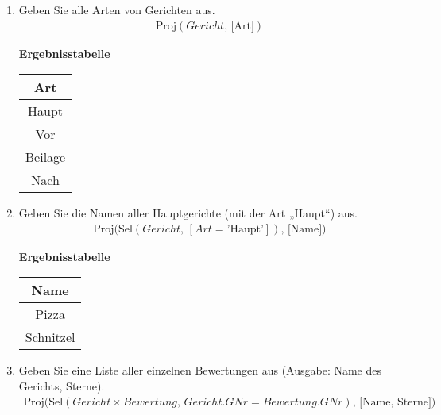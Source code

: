 \begin{enumerate}
    \item Geben Sie alle Arten von Gerichten aus.
        \begin{align*}
            \text{Proj}(Gericht,\, \text{[Art]})
        \end{align*}

        \begin{table}[H]
            \centering
            \textbf{Ergebnisstabelle} \\ [3pt]
            \begin{tabular}{|c|}
                \hline
                \textbf{Art}\\
                \hline
                Haupt \\
                Vor \\
                Beilage \\
                Nach\\
                \hline  
            \end{tabular}
        \end{table}

    \item Geben Sie die Namen aller Hauptgerichte (mit der Art „Haupt“) aus.
        \begin{align*}
            \text{Proj}\bigl(
            \text{Sel}(Gericht,\,[Art=\text{'Haupt'}]),\, \text{[Name]}
            \bigr)
        \end{align*}

        \begin{table}[H]
            \centering
            \textbf{Ergebnisstabelle} \\ [3pt]
            \begin{tabular}{|c|}
                \hline
                \textbf{Name}\\
                \hline
                Pizza \\
                Schnitzel \\
                \hline  
            \end{tabular}
        \end{table}

    \item Geben Sie eine Liste aller einzelnen Bewertungen aus (Ausgabe: Name des Gerichts, Sterne).
        \begin{align*}
            \text{Proj}\bigl(
            \text{Sel}(Gericht \times Bewertung,\, Gericht.GNr = Bewertung.GNr),\, \text{[Name, Sterne]}
            \bigr)
        \end{align*}


\end{enumerate}
